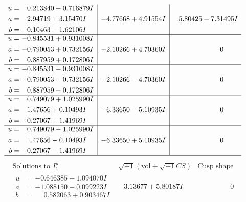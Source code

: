 \documentclass[1p]{elsarticle_modified}
\theoremstyle{definition}
\newcommand{\I}{\sqrt{-1}}
\begin{document}
$$\begin{array}{c|c|c}
\begin{aligned}
u &= \phantom{-}0.213840 - 0.716879 I \\
a &= \phantom{-}2.94719 + 3.15470 I \\
b &= -0.10463 - 1.62106 I\end{aligned}
 & -4.77668 + 4.91554 I & \phantom{-}5.80425 - 7.31495 I \\ \hline\begin{aligned}
u &= -0.845531 + 0.931008 I \\
a &= -0.790053 + 0.732156 I \\
b &= \phantom{-}0.887959 + 0.172806 I\end{aligned}
 & -2.10266 + 4.70360 I & \phantom{-0.000000 } 0 \\ \hline\begin{aligned}
u &= -0.845531 - 0.931008 I \\
a &= -0.790053 - 0.732156 I \\
b &= \phantom{-}0.887959 - 0.172806 I\end{aligned}
 & -2.10266 - 4.70360 I & \phantom{-0.000000 } 0 \\ \hline\begin{aligned}
u &= \phantom{-}0.749079 + 1.025990 I \\
a &= \phantom{-}1.47656 + 0.10493 I \\
b &= -0.27067 + 1.41969 I\end{aligned}
 & -6.33650 - 5.10935 I & \phantom{-0.000000 } 0 \\ \hline\begin{aligned}
u &= \phantom{-}0.749079 - 1.025990 I \\
a &= \phantom{-}1.47656 - 0.10493 I \\
b &= -0.27067 - 1.41969 I\end{aligned}
 & -6.33650 + 5.10935 I & \phantom{-0.000000 } 0\\
 \hline 
 \end{array}$$\newpage$$\begin{array}{c|c|c}  
\text{Solutions to }I^u_{1}& \I (\text{vol} + \sqrt{-1}CS) & \text{Cusp shape}\\
 \hline 
\begin{aligned}
u &= -0.646385 + 1.094070 I \\
a &= -1.088150 - 0.099223 I \\
b &= \phantom{-}0.582063 + 0.903467 I\end{aligned}
 & -3.13677 + 5.80187 I & \phantom{-0.000000 } 0 \\ \hline\begin{aligned}

\end{aligned}
\end{array}$$
\end{document}
